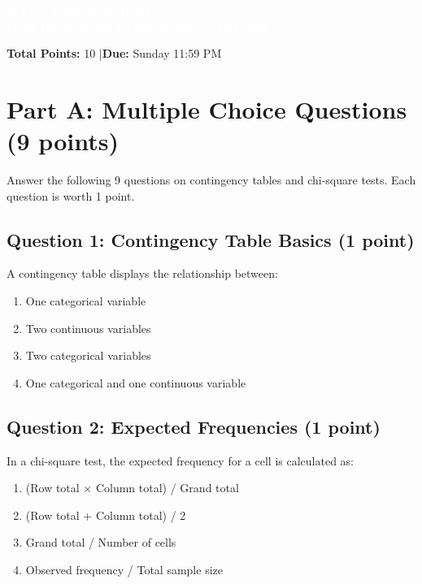 \documentclass[10pt]{article}
\begin{document}
\begin{tcolorbox}[colback=osaorange,colframe=black,boxrule=2pt,arc=0pt,left=6pt,right=6pt,top=8pt,bottom=8pt]
\centering
\textcolor{white}{\textbf{\large WEEK 8 ASSIGNMENT}}\\
\textcolor{white}{\textbf{H524 Introduction to Biostatistics - Fall 2025}}
\end{tcolorbox}

\vspace{4pt}

\noindent\textbf{Total Points:} 10 \quad|\quad \textbf{Due:} Sunday 11:59 PM

\vspace{6pt}

\section*{Part A: Multiple Choice Questions (9 points)}

Answer the following 9 questions on contingency tables and chi-square tests. Each question is worth 1 point.

\subsection*{Question 1: Contingency Table Basics (1 point)}
A contingency table displays the relationship between:
\begin{enumerate}[label=\Alph*., leftmargin=20pt]
\item One categorical variable
\item Two continuous variables
\item Two categorical variables
\item One categorical and one continuous variable
\end{enumerate}

\subsection*{Question 2: Expected Frequencies (1 point)}
In a chi-square test, the expected frequency for a cell is calculated as:
\begin{enumerate}[label=\Alph*., leftmargin=20pt]
\item (Row total × Column total) / Grand total
\item (Row total + Column total) / 2
\item Grand total / Number of cells
\item Observed frequency / Total sample size
\end{enumerate}
\end{document}
